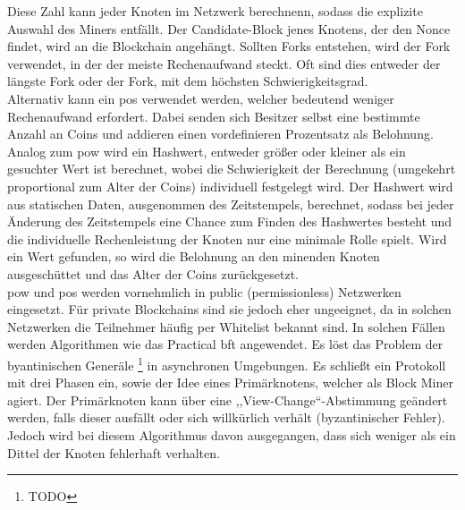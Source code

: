         Diese Zahl kann jeder Knoten im Netzwerk berechnenn, sodass die explizite Auswahl des Miners entfällt. 
        Der Candidate-Block jenes Knotens, der den Nonce findet, wird an die Blockchain angehängt. 
        Sollten Forks entstehen, wird der Fork verwendet, in der der meiste Rechenaufwand steckt. 
        Oft sind dies entweder der längste Fork oder der Fork, mit dem höchsten Schwierigkeitsgrad.\cite{Christidis2016,Nakamoto2008}
        \smallskip\\
        Alternativ kann ein \gls{pos} verwendet werden, welcher bedeutend weniger Rechenaufwand erfordert. 
        Dabei senden sich Besitzer selbst eine bestimmte Anzahl an Coins und addieren einen vordefinieren Prozentsatz als Belohnung. 
        Analog zum \gls{pow} wird ein Hashwert, entweder größer oder kleiner als ein gesuchter Wert ist berechnet, wobei die Schwierigkeit der Berechnung (umgekehrt proportional zum Alter der Coins) individuell festgelegt wird. 
        Der Hashwert wird aus statischen Daten, ausgenommen des Zeitstempels, berechnet, sodass bei jeder Änderung des Zeitstempels eine Chance zum Finden des Hashwertes besteht und die individuelle Rechenleistung der Knoten nur eine minimale Rolle spielt. 
        Wird ein Wert gefunden, so wird die Belohnung an den minenden Knoten ausgeschüttet und das Alter der Coins zurückgesetzt.\cite{Tschorsch2016}
        \medskip\\
        \gls{pow} und \gls{pos} werden vornehmlich in public (permissionless) Netzwerken eingesetzt.
        Für private Blockchains sind sie jedoch eher ungeeignet, da in solchen Netzwerken die Teilnehmer häufig per Whitelist bekannt sind. 
        In solchen Fällen werden Algorithmen wie das Practical \gls{bft} angewendet. Es löst das Problem der byantinischen Generäle
        \!\footnote{TODO
        } in asynchronen Umgebungen. 
        Es schließt ein Protokoll mit drei Phasen ein, sowie der Idee eines Primärknotens, welcher als Block Miner agiert. 
        Der Primärknoten kann über eine ,,View-Change``-Abstimmung geändert werden, falls dieser ausfällt oder sich willkürlich verhält (byzantinischer Fehler).
        Jedoch wird bei diesem Algorithmus davon ausgegangen, dass sich weniger als ein Dittel der Knoten fehlerhaft verhalten.
        \cite{Christidis2016}
    

